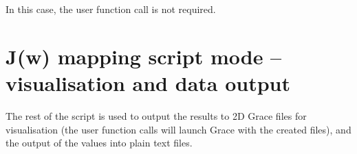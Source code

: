 In this case, the  user function call is not required.



\section{J(w) mapping script mode -- visualisation and data output}

The rest of the script is used to output the results to 2D Grace files for visualisation (the  user function calls will launch Grace with the created files), and the output of the values into plain text files.
